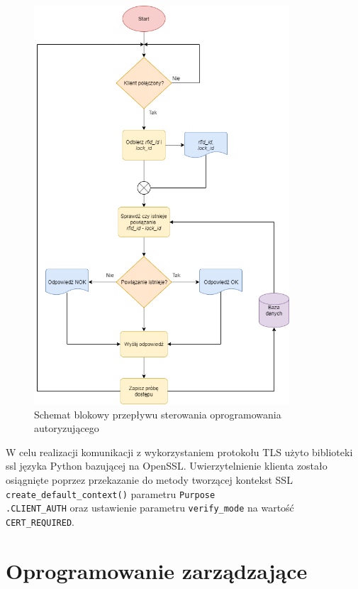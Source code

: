     	\begin{figure}[]
            \centering
            \includegraphics[width=0.85\textwidth]{chapters/images/flowchart5.png}
            \caption{Schemat blokowy przepływu sterowania oprogramowania autoryzującego}
            \label{fig:flowchart5}
        \end{figure}

    	W celu realizacji komunikacji z wykorzystaniem protokołu TLS użyto biblioteki ssl języka Python bazującej na OpenSSL. Uwierzytelnienie klienta zostało osiągnięte poprzez przekazanie do metody tworzącej kontekst SSL \texttt{create\_default\_context()} parametru \texttt{Purpose\\.CLIENT\_AUTH} oraz ustawienie parametru \texttt{verify\_mode} na wartość \texttt{CERT\_REQUIRED}.

    \section{Oprogramowanie zarządzające}

